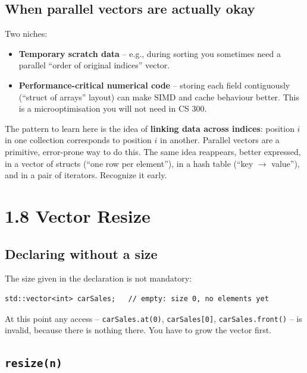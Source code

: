 \documentclass[11pt]{article}
\begin{document}
\subsection{When parallel vectors are actually okay}

Two niches:
\begin{itemize}
    \item \textbf{Temporary scratch data} -- e.g., during sorting you
          sometimes need a parallel ``order of original indices''
          vector.
    \item \textbf{Performance-critical numerical code} -- storing each
          field contiguously (``struct of arrays'' layout) can make
          SIMD and cache behaviour better. This is a microoptimisation
          you will not need in CS 300.
\end{itemize}

\begin{ideabox}
The pattern to learn here is the idea of \textbf{linking data across
indices}: position $i$ in one collection corresponds to position $i$
in another. Parallel vectors are a primitive, error-prone way to do
this. The same idea reappears, better expressed, in a vector of
structs (``one row per element''), in a hash table (``key $\to$
value''), and in a pair of iterators. Recognize it early.
\end{ideabox}

\section{1.8 Vector Resize}

\subsection{Declaring without a size}

The size given in the declaration is not mandatory:
\begin{lstlisting}
std::vector<int> carSales;   // empty: size 0, no elements yet
\end{lstlisting}
At this point any access -- \texttt{carSales.at(0)},
\texttt{carSales[0]}, \texttt{carSales.front()} -- is invalid, because
there is nothing there. You have to grow the vector first.

\subsection{\texttt{resize(n)}}
\end{document}
